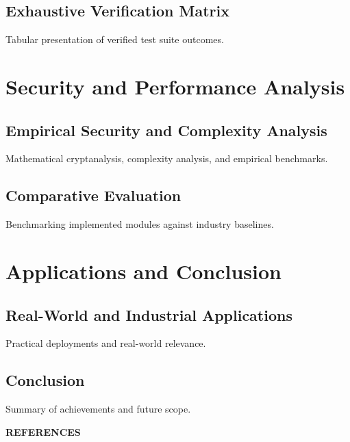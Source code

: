 \documentclass[12pt,a4paper]{report}
\begin{document}
\section{Exhaustive Verification Matrix}
Tabular presentation of verified test suite outcomes.

\newpage

\chapter{Security and Performance Analysis}

\section{Empirical Security and Complexity Analysis}
Mathematical cryptanalysis, complexity analysis, and empirical benchmarks.

\section{Comparative Evaluation}
Benchmarking implemented modules against industry baselines.

\newpage

\chapter{Applications and Conclusion}

\section{Real-World and Industrial Applications}
Practical deployments and real-world relevance.

\section{Conclusion}
Summary of achievements and future scope.

\newpage

\begin{center}
    {\fontsize{14}{16}\bfseries REFERENCES}\\[1.5em]
\end{center}
\end{document}

